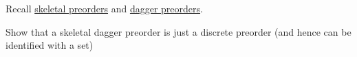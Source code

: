 
Recall \href{doc/1 math/Seven Sketches in Compositionality/1 Generative Effects/3 Preorders/Skeletality}{skeletal preorders} and \href{doc/1 math/Seven Sketches in Compositionality/1 Generative Effects/4 Monotone maps/2 Dagger preorder}{dagger preorders}.

Show that a skeletal dagger preorder is just a discrete preorder (and hence can be identified with a set)